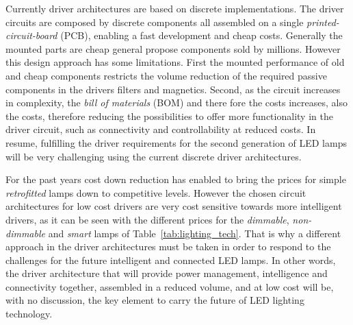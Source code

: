 Currently driver architectures are based on discrete implementations. The driver circuits are composed by discrete components all assembled on a single \emph{printed-circuit-board} (PCB), enabling a fast development and cheap costs. Generally the mounted parts are cheap general propose components sold by millions. However this design approach has some limitations. First the mounted performance of old and cheap components restricts the volume reduction of the required  passive components in the drivers filters and magnetics. Second, as the circuit increases in complexity, the \emph{bill of materials} (BOM) and there fore the costs increases, also the costs, therefore reducing the possibilities to offer more functionality in the driver circuit, such as connectivity and controllability at reduced costs. In resume, fulfilling the driver requirements for the second generation of LED lamps will be very challenging using the current discrete driver  architectures.

For the past years cost down reduction has enabled to bring the prices for simple \emph{retrofitted} lamps down to competitive levels. However the chosen circuit architectures for low cost drivers are very cost sensitive towards more intelligent drivers, as it can be seen with the different prices for the \emph{dimmable}, \emph{non-dimmable} and \emph{smart} lamps of  Table~\ref{tab:lighting_tech}. That is why a different approach in the driver architectures must be taken in order to respond to the challenges for the future intelligent and connected LED lamps. In other words, the driver architecture that will provide power management, intelligence and connectivity together, assembled in a reduced volume, and at low cost will be, with no discussion, the key element to carry the future of LED lighting technology.




